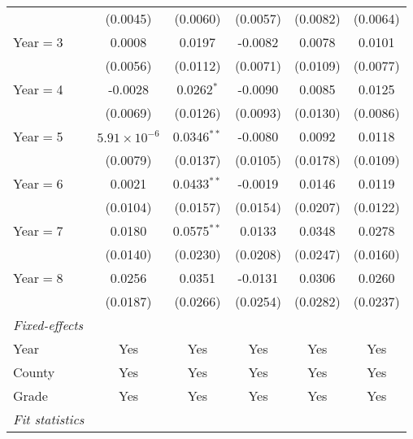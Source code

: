 \begin{table}[htbp]
\begin{tabular}{lccccc}
                           & (0.0045)               & (0.0060)       & (0.0057) & (0.0082)               & (0.0064)\\
      Year$=$3             & 0.0008                 & 0.0197         & -0.0082  & 0.0078                 & 0.0101\\
                           & (0.0056)               & (0.0112)       & (0.0071) & (0.0109)               & (0.0077)\\
      Year$=$4             & -0.0028                & 0.0262$^{*}$   & -0.0090  & 0.0085                 & 0.0125\\
                           & (0.0069)               & (0.0126)       & (0.0093) & (0.0130)               & (0.0086)\\
      Year$=$5             & $5.91\times 10^{-6}$  & 0.0346$^{**}$  & -0.0080  & 0.0092                 & 0.0118\\
                           & (0.0079)               & (0.0137)       & (0.0105) & (0.0178)               & (0.0109)\\
      Year$=$6             & 0.0021                 & 0.0433$^{**}$  & -0.0019  & 0.0146                 & 0.0119\\
                           & (0.0104)               & (0.0157)       & (0.0154) & (0.0207)               & (0.0122)\\
      Year$=$7             & 0.0180                 & 0.0575$^{**}$  & 0.0133   & 0.0348                 & 0.0278\\
                           & (0.0140)               & (0.0230)       & (0.0208) & (0.0247)               & (0.0160)\\
      Year$=$8             & 0.0256                 & 0.0351         & -0.0131  & 0.0306                 & 0.0260\\
                           & (0.0187)               & (0.0266)       & (0.0254) & (0.0282)               & (0.0237)\\
      \midrule \emph{Fixed-effects} &   &   &   &   &  \\
      Year                 & Yes                    & Yes            & Yes      & Yes                    & Yes\\
      County               & Yes                    & Yes            & Yes      & Yes                    & Yes\\
      Grade                & Yes                    & Yes            & Yes      & Yes                    & Yes\\
      \midrule \emph{Fit statistics} &   &   &   &   &  \\

\end{tabular}
\end{table}
